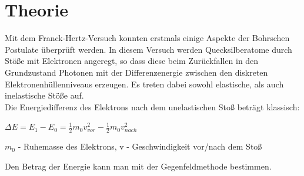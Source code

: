 

\section{Theorie}
\setcounter{page}{1}
Mit dem Franck-Hertz-Versuch konnten erstmals einige Aspekte der Bohrschen Postulate überprüft werden. In diesem Versuch werden Quecksilberatome durch Stöße mit Elektronen angeregt, so dass diese beim Zurückfallen in den Grundzustand Photonen mit der Differenzenergie zwischen den diskreten Elektronenhüllenniveaus erzeugen. Es treten dabei sowohl elastische, als auch inelastische Stöße auf.\\
Die Energiedifferenz des Elektrons nach dem unelastischen Stoß beträgt klassisch:
\begin{formel}[H]
$\Delta E = E_1-E_0 = \frac{1}{2}m_0v_{vor}^2 - \frac{1}{2}m_0v_{nach}^2$
\centering
\caption*{\small{$m_0$ - Ruhemasse des Elektrons, v - Geschwindigkeit vor/nach dem Stoß}}
\end{formel}
Den Betrag der Energie kann man mit der Gegenfeldmethode bestimmen.


